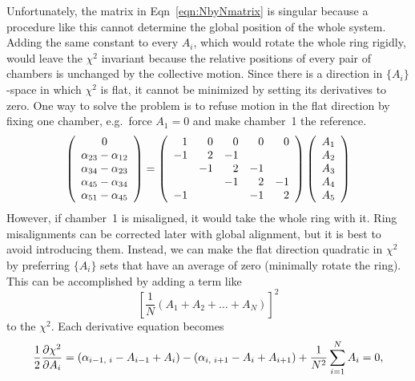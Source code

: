 \documentclass[12pt]{article}
\begin{document}
Unfortunately, the matrix in Eqn~\ref{eqn:NbyNmatrix} is singular
because a procedure like this cannot determine the global position of
the whole system.  Adding the same constant to every $A_i$, which
would rotate the whole ring rigidly, would leave the $\chi^2$
invariant because the relative positions of every pair of chambers is
unchanged by the collective motion.  Since there is a direction in
$\{A_i\}$-space in which $\chi^2$ is flat, it cannot be minimized by
setting its derivatives to zero.  One way to solve the problem is to
refuse motion in the flat direction by fixing one chamber, e.g.\ force
$A_1=0$ and make chamber~1 the reference.
\begin{equation}
\left(\begin{array}{c}
0 \\
\alpha_{23} - \alpha_{12} \\
\alpha_{34} - \alpha_{23} \\
\alpha_{45} - \alpha_{34} \\
\alpha_{51} - \alpha_{45}
\end{array} \right)
=
\left(\begin{array}{r r r r r}
1 & 0 & 0 & 0 & 0 \\
-1 & 2 & -1 &  &  \\
 & -1 & 2 & -1 &  \\
 &  & -1 & 2 & -1 \\
-1 &  &  & -1 & 2
\end{array}\right)
\left(\begin{array}{c}
A_1 \\
A_2 \\
A_3 \\
A_4 \\
A_5 \\
\end{array} \right)
\end{equation}
However, if chamber~1 is misaligned, it would take the whole ring with
it.  Ring misalignments can be corrected later with global alignment,
but it is best to avoid introducing them.  Instead, we can make the
flat direction quadratic in $\chi^2$ by preferring $\{A_i\}$ sets that
have an average of zero (minimally rotate the ring).  This can be
accomplished by adding a term like
\begin{equation}
\left[ \frac{1}{N} \left(A_1 + A_2 + \ldots + A_N\right) \right]^2
\label{eqn:average}
\end{equation}
to the $\chi^2$.  Each derivative equation becomes
\begin{equation}
\frac{1}{2} \frac{\partial \chi^2}{\partial A_i} = (\alpha_{i-1\mbox{\scriptsize, }i} - A_{i-1} + A_i) - (\alpha_{i\mbox{\scriptsize, }i+1} - A_i + A_{i+1}) + \frac{1}{N^2} \sum_{i=1}^N A_i = 0 \mbox{,}
\end{equation}
\end{document}
